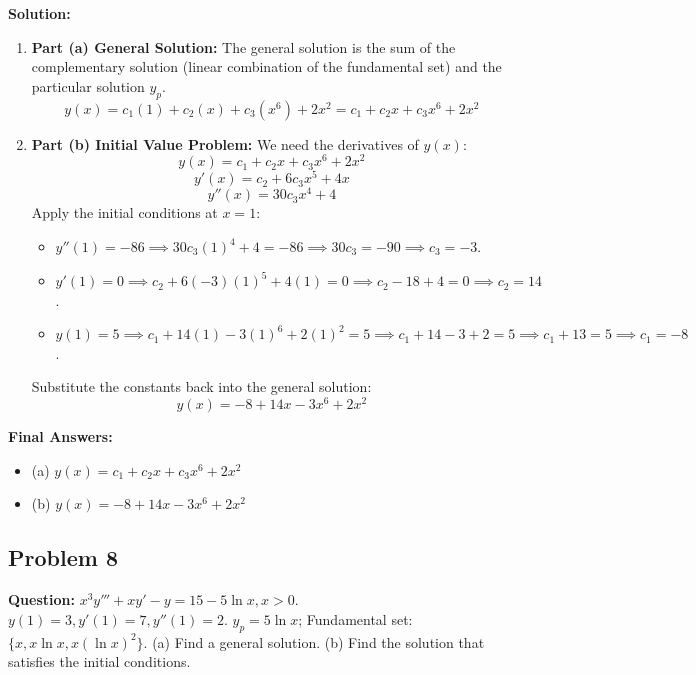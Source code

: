 \documentclass[11pt, a4paper]{article}
\theoremstyle{definition}
\theoremstyle{remark}
\begin{document}
\textbf{Solution:}
\begin{enumerate}
    \item \textbf{Part (a) General Solution:} The general solution is the sum of the complementary solution (linear combination of the fundamental set) and the particular solution $y_p$.
    \[ y(x) = c_1(1) + c_2(x) + c_3(x^6) + 2x^2 = c_1 + c_2 x + c_3 x^6 + 2x^2 \]
    \item \textbf{Part (b) Initial Value Problem:} We need the derivatives of $y(x)$:
    \[ y(x) = c_1 + c_2 x + c_3 x^6 + 2x^2 \]
    \[ y'(x) = c_2 + 6c_3 x^5 + 4x \]
    \[ y''(x) = 30c_3 x^4 + 4 \]
    Apply the initial conditions at $x=1$:
    \begin{itemize}
        \item $y''(1) = -86 \implies 30c_3(1)^4 + 4 = -86 \implies 30c_3 = -90 \implies c_3 = -3$.
        \item $y'(1) = 0 \implies c_2 + 6(-3)(1)^5 + 4(1) = 0 \implies c_2 - 18 + 4 = 0 \implies c_2 = 14$.
        \item $y(1) = 5 \implies c_1 + 14(1) - 3(1)^6 + 2(1)^2 = 5 \implies c_1 + 14 - 3 + 2 = 5 \implies c_1 + 13 = 5 \implies c_1 = -8$.
    \end{itemize}
    Substitute the constants back into the general solution:
    \[ y(x) = -8 + 14x - 3x^6 + 2x^2 \]
\end{enumerate}
\textbf{Final Answers:}
\begin{itemize}
    \item (a) $y(x) = c_1 + c_2 x + c_3 x^6 + 2x^2$
    \item (b) $y(x) = -8 + 14x - 3x^6 + 2x^2$
\end{itemize}

\vspace{1em}
\subsection{Problem 8}
\textbf{Question:} $x^3 y''' + xy' - y = 15 - 5\ln x, x>0$. $y(1)=3, y'(1)=7, y''(1)=2$. $y_p = 5\ln x$; Fundamental set: $\{x, x\ln x, x(\ln x)^2\}$.
(a) Find a general solution. (b) Find the solution that satisfies the initial conditions.
\end{document}
